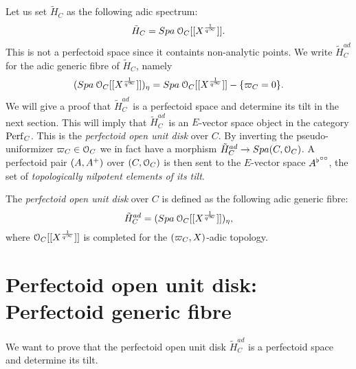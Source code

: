 Let us set $\tilde{H}_{C}$ as the following adic spectrum:
$$\tilde{H}_{C} = {Spa{\:\mathcal{O}_C[[X^{\frac{1}{q^\infty}}]]}}.$$
This is not a perfectoid space since it containts non-analytic points.
We write  $\tilde{H}^{ad}_{C}$ for the adic generic fibre of $\tilde{H}_{C}$, namely  
$$({Spa{\:\mathcal{O}_C[[X^{\frac{1}{q^\infty}}]]}})_{\eta} = {Spa{\:\mathcal{O}_C[[X^{\frac{1}{q^\infty}}]]}}-\{\varpi_C=0\}.$$
We will give a proof that $\tilde{H}^{ad}_{C}$ is a perfectoid space and determine its tilt in the next section.
This will imply that $\tilde{H}^{ad}_{C}$ is an $E$-vector space object in the category $\mathrm{Perf}_{C}$. This is the \emph{perfectoid open unit disk} over $C$. By inverting the pseudo-uniformizer $\varpi_C\in\mathcal{O}_C$ we in fact have a morphism  $\tilde{H}^{ad}_{C}\to{Spa({C},{\mathcal{O}_C})}$. A perfectoid pair $(A, A{^{+}})$ over $(C, \mathcal{O}_C)$ is then sent to the $E$-vector space ${A^{\flat}}^{\circ\circ}$, the set of \emph{topologically nilpotent elements of its tilt}.

\begin{definition}
The \emph{perfectoid open unit disk} over $C$ is defined as the following adic generic fibre:
$$\tilde{H}^{ad}_{C} = ({Spa{\:\mathcal{O}_C[[X^{\frac{1}{q^\infty}}]]}})_{\eta},$$
where $\mathcal{O}_C[[X^{\frac{1}{q^\infty}}]]$ is completed for the $(\varpi_C, X)$-adic topology.
\end{definition}


\section{Perfectoid open unit disk: Perfectoid generic fibre}
We want to prove that the perfectoid open unit disk $\tilde{H}^{ad}_{C}$ is a perfectoid space and determine its tilt.

